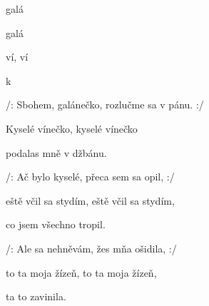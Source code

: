 

\zs
{} galá
   

 galá
   

 ví,  ví 

  k 
\ks

\zs
/: Sbohem, galánečko, rozlučme sa v pánu. :/

Kyselé vínečko, kyselé vínečko

podalas mně v džbánu.
\ks

\zs
/: Ač bylo kyselé, přeca sem sa opil, :/

eště včil sa stydím, eště včil sa stydím,

co jsem všechno tropil.
\ks

\zs
/: Ale sa nehněvám, žes mňa ošidila, :/

to ta moja žízeň, to ta moja žízeň,

ta to zavinila.
\ks
\kp

